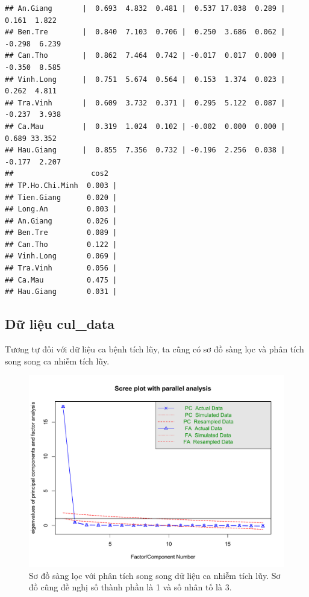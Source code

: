 \documentclass[../thesis.tex]{subfiles}
\begin{document}
\begin{verbatim}
## An.Giang       |  0.693  4.832  0.481 |  0.537 17.038  0.289 |  0.161  1.822
## Ben.Tre        |  0.840  7.103  0.706 |  0.250  3.686  0.062 | -0.298  6.239
## Can.Tho        |  0.862  7.464  0.742 | -0.017  0.017  0.000 | -0.350  8.585
## Vinh.Long      |  0.751  5.674  0.564 |  0.153  1.374  0.023 |  0.262  4.811
## Tra.Vinh       |  0.609  3.732  0.371 |  0.295  5.122  0.087 | -0.237  3.938
## Ca.Mau         |  0.319  1.024  0.102 | -0.002  0.000  0.000 |  0.689 33.352
## Hau.Giang      |  0.855  7.356  0.732 | -0.196  2.256  0.038 | -0.177  2.207
##                  cos2  
## TP.Ho.Chi.Minh  0.003 |
## Tien.Giang      0.020 |
## Long.An         0.003 |
## An.Giang        0.026 |
## Ben.Tre         0.089 |
## Can.Tho         0.122 |
## Vinh.Long       0.069 |
## Tra.Vinh        0.056 |
## Ca.Mau          0.475 |
## Hau.Giang       0.031 |
\end{verbatim}

\newpage
\subsection{Dữ liệu \textbf{\textsf{cul\_data}}}

Tương tự đối với dữ liệu ca bệnh tích lũy, ta cũng có sơ đồ sàng lọc và phân tích song song ca nhiễm tích lũy.
\begin{Shaded}
	\begin{Highlighting}[]
\SpecialCharTok{\%\textgreater{}\%}\SpecialCharTok{::}
		 \NormalTok{)}
	\end{Highlighting}
\end{Shaded}

\begin{figure}[H]
	\centering
	\includegraphics[width=1\linewidth]{images/scree_parallcul}
	\caption[Sơ đồ sàng lọc với phân tích song song dữ liệu ca nhiễm hằng ngày]{Sơ đồ sàng lọc với phân tích song song dữ liệu ca nhiễm tích lũy. Sơ đồ cũng đề nghị số thành phần là 1 và số nhân tố là 3. }
	\label{fig:screeparallcul}
\end{figure}
\end{document}
